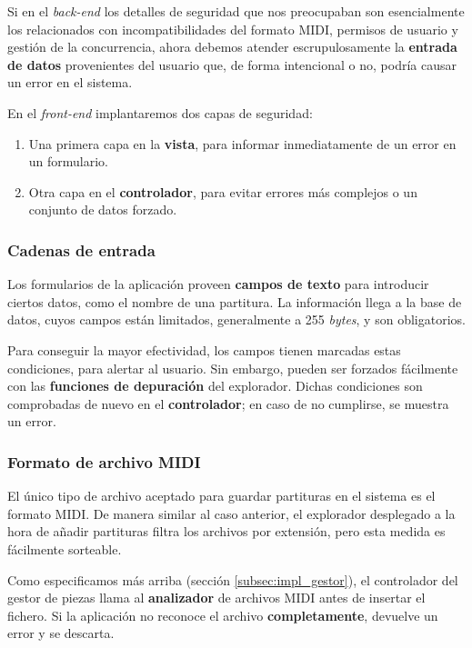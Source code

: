Si en el \textit{back-end} los detalles de seguridad que nos preocupaban son esencialmente los relacionados con incompatibilidades del formato \acrshort{MIDI}, permisos de usuario y gestión de la concurrencia, ahora debemos atender escrupulosamente la \textbf{entrada de datos} provenientes del usuario que, de forma intencional o no, podría causar un error en el sistema.

En el \textit{front-end} implantaremos dos capas de seguridad:

\begin{enumerate}
	\item Una primera capa en la \textbf{vista}, para informar inmediatamente de un error en un formulario.
	\item Otra capa en el \textbf{controlador}, para evitar errores más complejos o un conjunto de datos forzado.
\end{enumerate}

\subsubsection{Cadenas de entrada}

Los formularios de la aplicación proveen \textbf{campos de texto} para introducir ciertos datos, como el nombre de una partitura. La información llega a la base de datos, cuyos campos están limitados, generalmente a 255 \textit{bytes}, y son obligatorios.

Para conseguir la mayor efectividad, los campos  tienen marcadas estas condiciones, para alertar al usuario. Sin embargo, pueden ser forzados fácilmente con las \textbf{funciones de depuración} del explorador. Dichas condiciones son comprobadas de nuevo en el \textbf{controlador}; en caso de no cumplirse, se muestra un error.

\subsubsection{Formato de archivo MIDI}

El único tipo de archivo aceptado para guardar partituras en el sistema es el formato \acrshort{MIDI}. De manera similar al caso anterior, el explorador desplegado a la hora de añadir partituras filtra los archivos por extensión, pero esta medida es fácilmente sorteable.

Como especificamos más arriba (sección \ref{subsec:impl_gestor}), el controlador del gestor de piezas llama al \textbf{analizador} de archivos \acrshort{MIDI} antes de insertar el fichero. Si la aplicación no reconoce el archivo \textbf{completamente}, devuelve un error y se descarta.

